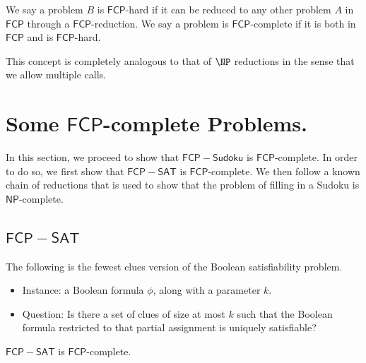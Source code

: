 \documentclass[runningheads,a4paper]{llncs}
\begin{document}
We say a problem $B$ is $\mathsf{FCP}$-hard if it can be reduced to any other problem $A$ in $\mathsf{FCP}$ through a $\mathsf{FCP}$-reduction. We say a problem is $\mathsf{FCP}$-complete if it is both in $\mathsf{FCP}$ and is $\mathsf{FCP}$-hard. 

This concept is completely analogous to that of $\NP$ reductions in the sense that we allow multiple calls. 

\section{Some $\mathsf{FCP}$-complete Problems.}
\label{sec:The Problems}

In this section, we proceed to show that $\mathsf{FCP-Sudoku}$ is $\mathsf{FCP}$-complete. In order to do so, we first show that $\mathsf{FCP-SAT}$ is $\mathsf{FCP}$-complete. We then follow a known chain of reductions that is used to show that the problem of filling in a Sudoku is $\mathsf{NP}$-complete. 

\subsection{$\mathsf{FCP-SAT}$}
The following is the fewest clues version of the Boolean satisfiability problem.

\begin{itemize}
\item Instance: a Boolean formula $\phi$, along with a parameter $k$.
\item Question: Is there a set of clues of size at most $k$ such that the Boolean formula restricted to that partial assignment is uniquely satisfiable?
\end{itemize}

\begin{theorem}
$\mathsf{FCP-SAT}$ is $\mathsf{FCP}$-complete.
\end{theorem}
\end{document}
